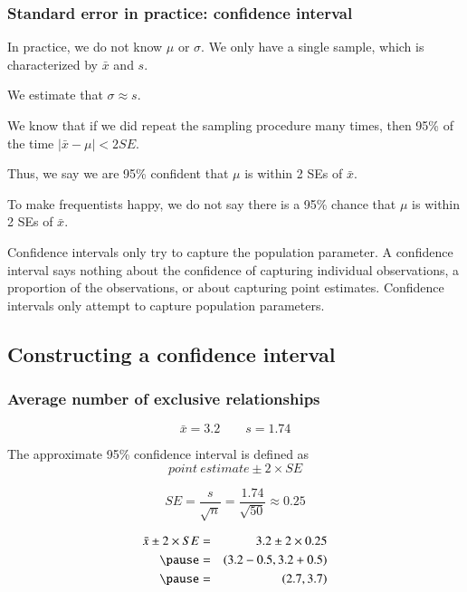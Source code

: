 \begin{frame}
\frametitle{Standard error in practice: confidence interval}
In practice, we do not know $\mu$ or $\sigma$. We only have a single sample, which is characterized by $\bar{x}$ and $s$. \pause

We estimate that $\sigma \approx s$. \pause

We know that if we did repeat the sampling procedure many times, then 95\% of the time $|\bar{x}-\mu| < 2SE$. \pause

Thus, we say we are 95\% confident that $\mu$ is within 2 SEs of $\bar{x}$. \pause

To make frequentists happy, we do not say there is a 95\% chance that $\mu$ is within 2 SEs of $\bar{x}$. \pause

Confidence intervals only try to capture the population parameter. A confidence interval says nothing about the confidence of capturing individual observations, a proportion of the observations, or about capturing point estimates. Confidence intervals only attempt to capture population parameters.

\end{frame}




\subsection{Constructing a confidence interval}


\begin{frame}
\frametitle{Average number of exclusive relationships}


\pause 

\vspace{-0.5cm}
\[ \bar{x} = 3.2 \qquad s = 1.74 \]

\pause
\vspace{-0.25cm}
The approximate 95\% confidence interval is defined as 
\[ point~estimate \pm 2 \times SE \]

\vspace{-0.25cm}
\pause

\vspace{-0.25cm}
\[ SE = \frac{s}{\sqrt{n}} = \frac{1.74}{\sqrt{50}} \approx 0.25 \]

\pause

\vspace{-0.25cm}
\begin{eqnarray*}
\bar{x} \pm 2 \times SE &=& 3.2 \pm 2 \times 0.25 \\
\pause
&=& (3.2 - 0.5, 3.2 + 0.5) \\
\pause
&=& (2.7, 3.7)
\end{eqnarray*}


\end{frame}

